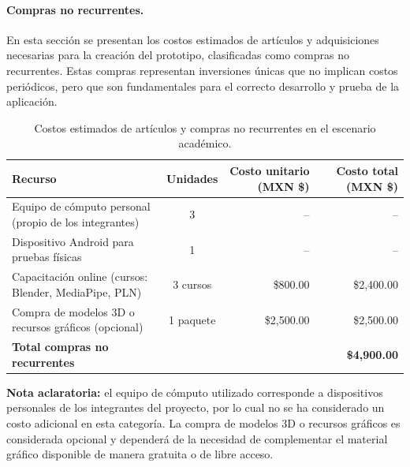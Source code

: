 \paragraph{\textbf{Compras no recurrentes.}} 
En esta sección se presentan los costos estimados de artículos y adquisiciones necesarias para la creación del prototipo, clasificadas como compras no recurrentes. Estas compras representan inversiones únicas que no implican costos periódicos, pero que son fundamentales para el correcto desarrollo y prueba de la aplicación.

\begin{table}[H]
	\centering
	\renewcommand{\arraystretch}{1.6}
	\setlength{\tabcolsep}{10pt}
	\Huge
	\begin{adjustbox}{max width=\textwidth}
		\begin{tabular}{|p{7cm}|c|r|r|}
			\hline
			\textbf{Recurso} & \textbf{Unidades} & \textbf{Costo unitario (MXN \$)} & \textbf{Costo total (MXN \$)} \\ \hline
			Equipo de cómputo personal (propio de los integrantes) & 3 & -- & -- \\ \hline
			Dispositivo Android para pruebas físicas & 1 & -- & -- \\ \hline
			Capacitación online (cursos: Blender, MediaPipe, PLN) & 3 cursos & \$800.00 & \$2,400.00 \\ \hline
			Compra de modelos 3D o recursos gráficos (opcional) & 1 paquete & \$2,500.00 & \$2,500.00 \\ \hline
			\textbf{Total compras no recurrentes} & & & \textbf{\$4,900.00} \\ \hline
		\end{tabular}
	\end{adjustbox}
	\caption{Costos estimados de artículos y compras no recurrentes en el escenario académico.}
	\label{tab:compras_no_recurrentes}
\end{table}


\noindent \textbf{Nota aclaratoria:}  
el equipo de cómputo utilizado corresponde a dispositivos personales de los integrantes del proyecto, por lo cual no se ha considerado un costo adicional en esta categoría. La compra de modelos 3D o recursos gráficos es considerada opcional y dependerá de la necesidad de complementar el material gráfico disponible de manera gratuita o de libre acceso.

